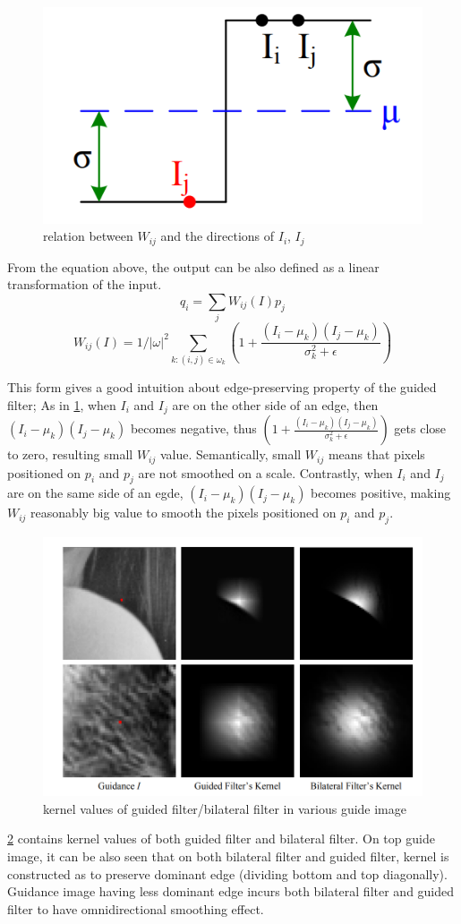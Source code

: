\documentclass[extendedabs]{bmvc2k}
\begin{document}
\begin{figure}[h]
    \centering
    \includegraphics[width=0.3\linewidth]{hw2_1_3}
    \caption{relation between $W_{ij}$ and the directions of $I_i$, $I_j$}
    \label{fig:3}
\end{figure}

From the equation above, the output can be also defined as a linear transformation of the input.
\[q_i = \sum_{j}W_{ij}(I)p_j\]
\[W_{ij}(I) = 1/|\omega|^2\sum_{k:(i,j) \in \omega_k}(1 + \frac{(I_i - \mu_k)(I_j - \mu_k)}{\sigma_k^2 + \epsilon})\]

This form gives a good intuition about edge-preserving property of the guided filter;
As in \figurename{\ref{fig:3}}, when $I_i$ and $I_j$ are on the other side of an edge, 
then $(I_i-\mu_k)(I_j-\mu_k)$ becomes negative, 
thus $(1 + \frac{(I_i - \mu_k)(I_j - \mu_k)}{\sigma_k^2 + \epsilon})$ gets close to zero,
resulting small $W_{ij}$ value. Semantically, small $W_{ij}$ means that 
pixels positioned on $p_i$ and $p_j$ are not smoothed on a scale.
Contrastly, when $I_i$ and $I_j$ are on the same side
of an egde, $(I_i-\mu_k)(I_j-\mu_k)$ becomes positive, making $W_{ij}$ reasonably big
value to smooth the pixels positioned on $p_i$ and $p_j$.

\begin{figure}[h]
    \centering
    \includegraphics[width=0.8\linewidth]{hw2_1_5}
    \caption{kernel values of guided filter/bilateral filter in various guide image}
    \label{fig:5}
\end{figure}

\figurename{\ref{fig:5}} contains kernel values of both guided filter and bilateral filter.
On top guide image, it can be also seen that on both bilateral filter and guided filter, 
kernel is constructed as to preserve dominant edge (dividing bottom and top diagonally).
Guidance image having less dominant edge incurs both bilateral filter and guided filter
to have omnidirectional smoothing effect.
\end{document}
